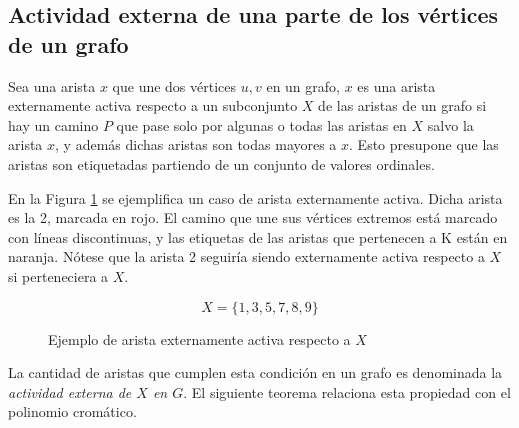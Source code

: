 \documentclass{article}
\numberwithin{figure}{section}
\begin{document}
\subsection{Actividad externa de una parte de los vértices de un grafo}

Sea una arista $x$ que une dos vértices $u, v$ en un grafo, $x$ es una arista externamente activa respecto a un subconjunto $X$ de las aristas de un grafo si hay un camino $P$ que pase solo por algunas o todas las aristas en $X$ salvo la arista $x$, y además dichas aristas son todas mayores a $x$. Esto presupone que las aristas son etiquetadas partiendo de un conjunto de valores ordinales.

En la Figura \ref{fig:extact} se ejemplifica un caso de arista externamente activa. Dicha arista es la 2, marcada en rojo. El camino que une sus vértices extremos está marcado con líneas discontinuas, y las etiquetas de las aristas que pertenecen a K están en naranja. Nótese que la arista 2 seguiría siendo externamente activa respecto a $X$ si perteneciera a $X$.

\begin{figure}[h]
\caption{Ejemplo de arista externamente activa respecto a $X$}
\label{fig:extact}
\centering
\begin{equation*}
    X = \{1, 3, 5, 7, 8, 9\}
\end{equation*}
\end{figure}

La cantidad de aristas que cumplen esta condición en un grafo es denominada la \emph{actividad externa de $X$ en $G$}. El siguiente teorema relaciona esta propiedad con el polinomio cromático.
\end{document}
